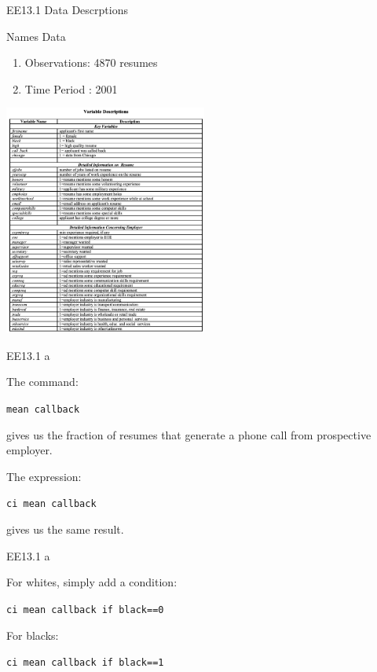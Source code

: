\begin{frame}[fragile]{EE13.1 Data Descrptions}

Names Data

\begin{enumerate}
    \item Observations: 4870 resumes
    \item Time Period : 2001
\end{enumerate}
\includegraphics[width=0.5\textwidth]{Images/EE13-1_4.png}

\end{frame}


\begin{frame}[fragile]{EE13.1 a}

The command:

\texttt{mean callback} 

gives us the fraction of resumes that generate a phone call from prospective employer.

The expression:

\texttt{ci mean callback} 

gives us the same result.
\end{frame}


\begin{frame}[fragile]{EE13.1 a}

For whites, simply add a condition:

\texttt{ci mean callback if black==0}

For blacks:

\texttt{ci mean callback if black==1}

\end{frame}



